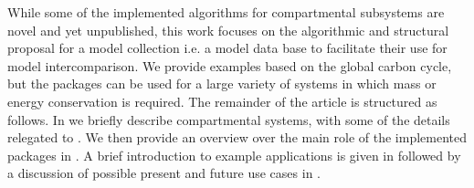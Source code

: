 
While some of the implemented algorithms for compartmental subsystems are novel 
and yet unpublished, this work focuses on the algorithmic and structural proposal for a model collection
i.e. a model data base to facilitate their use for model intercomparison. 
We provide examples based on the global carbon cycle, but the
packages can be used for a large variety of systems in which mass or energy
conservation is required.
The remainder of the article is structured as follows.
In  we briefly describe compartmental systems, with some of the details
relegated to .
We then provide an overview over the main role of the implemented packages in 
. A brief introduction to example applications
is given in  followed by a discussion of
possible present and future use cases in
. 



